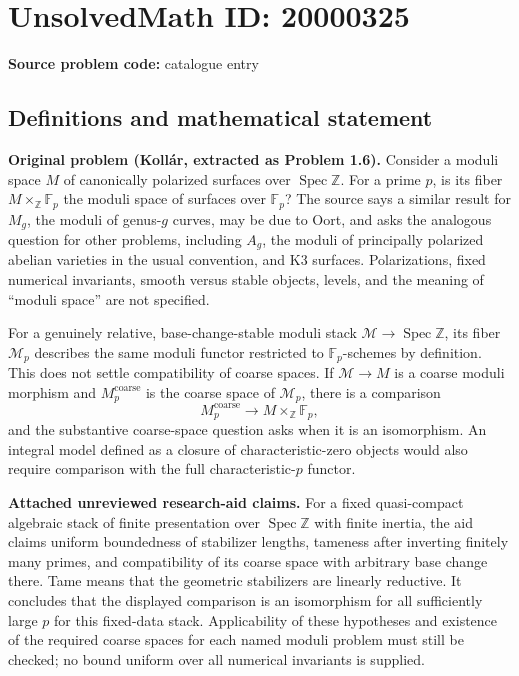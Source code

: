 \documentclass[11pt]{article}
\newcommand{\Z}{\mathbb{Z}}
\newcommand{\F}{\mathbb{F}}
\begin{document}
\section*{UnsolvedMath ID: 20000325}
\textbf{Source problem code:} catalogue entry
\subsection{Definitions and mathematical statement}
\textbf{Original problem (Kollár, extracted as Problem 1.6).} Consider a moduli space $M$ of canonically polarized surfaces over $\operatorname{Spec}\Z$. For a prime $p$, is its fiber $M\times_{\Z}\F_p$ the moduli space of surfaces over $\F_p$? The source says a similar result for $M_g$, the moduli of genus-$g$ curves, may be due to Oort, and asks the analogous question for other problems, including $A_g$, the moduli of principally polarized abelian varieties in the usual convention, and K3 surfaces. Polarizations, fixed numerical invariants, smooth versus stable objects, levels, and the meaning of ``moduli space'' are not specified.

For a genuinely relative, base-change-stable moduli stack $\mathcal M\to\operatorname{Spec}\Z$, its fiber $\mathcal M_p$ describes the same moduli functor restricted to $\F_p$-schemes by definition. This does not settle compatibility of coarse spaces. If $\mathcal M\to M$ is a coarse moduli morphism and $M_p^{\mathrm{coarse}}$ is the coarse space of $\mathcal M_p$, there is a comparison
\[M_p^{\mathrm{coarse}}\longrightarrow M\times_{\Z}\F_p,\]
and the substantive coarse-space question asks when it is an isomorphism. An integral model defined as a closure of characteristic-zero objects would also require comparison with the full characteristic-$p$ functor.

\textbf{Attached unreviewed research-aid claims.} For a fixed quasi-compact algebraic stack of finite presentation over $\operatorname{Spec}\Z$ with finite inertia, the aid claims uniform boundedness of stabilizer lengths, tameness after inverting finitely many primes, and compatibility of its coarse space with arbitrary base change there. Tame means that the geometric stabilizers are linearly reductive. It concludes that the displayed comparison is an isomorphism for all sufficiently large $p$ for this fixed-data stack. Applicability of these hypotheses and existence of the required coarse spaces for each named moduli problem must still be checked; no bound uniform over all numerical invariants is supplied.
\end{document}
